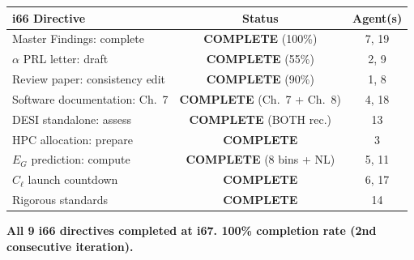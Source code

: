 \documentclass[11pt,a4paper]{article}
\begin{document}
\begin{center}
\begin{longtable}{lcc}
\toprule
\textbf{i66 Directive} & \textbf{Status} & \textbf{Agent(s)} \\
\midrule
Master Findings: complete & \textbf{COMPLETE} (100\%) & 7, 19 \\
$\alpha$ PRL letter: draft & \textbf{COMPLETE} (55\%) & 2, 9 \\
Review paper: consistency edit & \textbf{COMPLETE} (90\%) & 1, 8 \\
Software documentation: Ch.\ 7 & \textbf{COMPLETE} (Ch.\ 7 + Ch.\ 8) & 4, 18 \\
DESI standalone: assess & \textbf{COMPLETE} (BOTH rec.) & 13 \\
HPC allocation: prepare & \textbf{COMPLETE} & 3 \\
$E_G$ prediction: compute & \textbf{COMPLETE} (8 bins + NL) & 5, 11 \\
$C_\ell$ launch countdown & \textbf{COMPLETE} & 6, 17 \\
Rigorous standards & \textbf{COMPLETE} & 14 \\
\bottomrule
\end{longtable}
\end{center}

\textbf{All 9 i66 directives completed at i67. 100\% completion rate (2nd consecutive iteration).}
\end{document}

